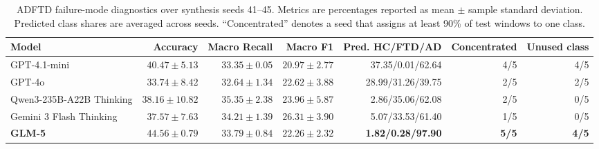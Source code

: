 \begin{table}[t]
\centering
\small
\caption{ADFTD failure-mode diagnostics over synthesis seeds 41--45. Metrics
are percentages reported as mean $\pm$ sample standard deviation. Predicted
class shares are averaged across seeds. ``Concentrated'' denotes a seed that
assigns at least 90\% of test windows to one class.}
\label{tab:adftd_failure_modes}
\begin{tabular}{lrrrrrr}
\toprule
Model & Accuracy & Macro Recall & Macro F1 &
Pred. HC/FTD/AD & Concentrated & Unused class \\
\midrule
GPT-4.1-mini & $40.47\pm5.13$ & $33.35\pm0.05$ & $20.97\pm2.77$ &
37.35/0.01/62.64 & 4/5 & 4/5 \\
GPT-4o & $33.74\pm8.42$ & $32.64\pm1.34$ & $22.62\pm3.88$ &
28.99/31.26/39.75 & 2/5 & 2/5 \\
Qwen3-235B-A22B Thinking & $38.16\pm10.82$ & $35.35\pm2.38$ &
$23.96\pm5.87$ & 2.86/35.06/62.08 & 2/5 & 0/5 \\
Gemini 3 Flash Thinking & $37.57\pm7.63$ & $34.21\pm1.39$ &
$26.31\pm3.90$ & 5.07/33.53/61.40 & 1/5 & 0/5 \\
\textbf{GLM-5} & $\mathbf{44.56\pm0.79}$ & $\mathbf{33.79\pm0.84}$ &
$\mathbf{22.26\pm2.32}$ & \textbf{1.82/0.28/97.90} & \textbf{5/5} &
\textbf{4/5} \\
\bottomrule
\end{tabular}
\end{table}

